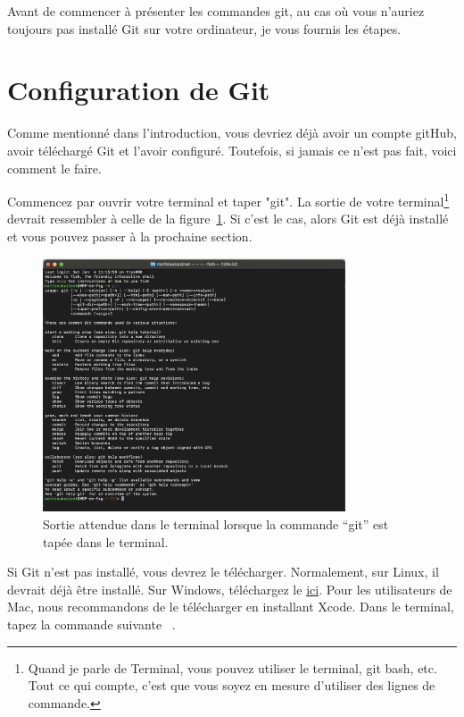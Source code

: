 \documentclass{book}
\newcommand{\code}[1]{\mbox{%
    \ttfamily
    \tcbox[
        on line,
        boxsep=0pt, left=4pt, right=4pt, top=2pt, bottom=1.5pt,
        toprule=0pt, rightrule=0pt, bottomrule=0pt, leftrule=0pt,
        oversize=0pt, enlarge left by=0pt, enlarge right by=0pt,
        colframe=white, colback=black!12,
        height=.8\baselineskip %
    ]{#1}%
}}
\begin{document}
Avant de commencer à présenter les commandes git, au cas où vous n'auriez toujours pas installé Git sur votre ordinateur, je vous fournis les étapes. 

\section{Configuration de Git}

Comme mentionné dans l'introduction, vous devriez déjà avoir un compte gitHub, avoir téléchargé Git et l'avoir configuré. Toutefois, si jamais ce n'est pas fait, voici comment le faire. 

Commencez par ouvrir votre terminal et taper "git". La sortie de votre terminal\footnote{Quand je parle de Terminal, vous pouvez utiliser le terminal, git bash, etc. Tout ce qui compte, c'est que vous soyez en mesure d'utiliser des lignes de commande.} devrait ressembler à celle de la figure~\ref{fig:check_if_git}. Si c'est le cas, alors Git est déjà installé et vous pouvez passer à la prochaine section. 

\begin{figure}[!h]
    \centering
    \includegraphics[width=0.8\textwidth]{images/check_if_git.png}
    \caption{Sortie attendue dans le terminal lorsque la commande ``git'' est tapée dans le terminal.} \label{fig:check_if_git}
\end{figure}

Si Git n'est pas installé, vous devrez le télécharger. Normalement, sur Linux, il devrait déjà être installé. Sur Windows, téléchargez le \href{https://git-scm.com/}{ici}. Pour les utilisateurs de Mac, nous recommandons de le télécharger en installant Xcode. Dans le terminal, tapez la commande suivante \code{xcode-select --install}.
\end{document}
